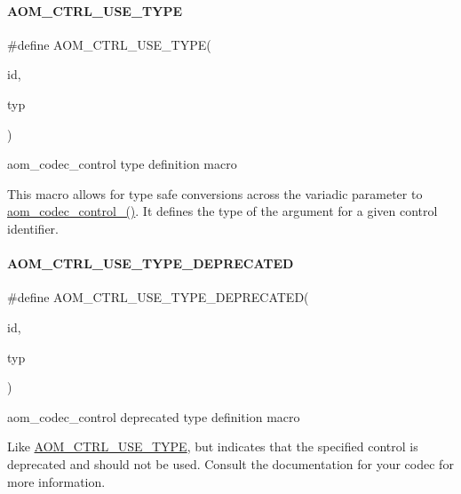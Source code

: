 \paragraph{\texorpdfstring{A\+O\+M\+\_\+\+C\+T\+R\+L\+\_\+\+U\+S\+E\+\_\+\+T\+Y\+PE}{AOM\_CTRL\_USE\_TYPE}}
{\footnotesize\ttfamily \#define A\+O\+M\+\_\+\+C\+T\+R\+L\+\_\+\+U\+S\+E\+\_\+\+T\+Y\+PE(\begin{DoxyParamCaption}\item[{}]{id,  }\item[{}]{typ }\end{DoxyParamCaption})}



aom\+\_\+codec\+\_\+control type definition macro 

This macro allows for type safe conversions across the variadic parameter to \hyperlink{group__codec_ga51eb332a40dcacc39000ab8e0be36b79}{aom\+\_\+codec\+\_\+control\+\_\+()}. It defines the type of the argument for a given control identifier. \mbox{\label{group__codec_ga9cf4b5ac7ea31c5c1b71816aec572acf}} 
\paragraph{\texorpdfstring{A\+O\+M\+\_\+\+C\+T\+R\+L\+\_\+\+U\+S\+E\+\_\+\+T\+Y\+P\+E\+\_\+\+D\+E\+P\+R\+E\+C\+A\+T\+ED}{AOM\_CTRL\_USE\_TYPE\_DEPRECATED}}
{\footnotesize\ttfamily \#define A\+O\+M\+\_\+\+C\+T\+R\+L\+\_\+\+U\+S\+E\+\_\+\+T\+Y\+P\+E\+\_\+\+D\+E\+P\+R\+E\+C\+A\+T\+ED(\begin{DoxyParamCaption}\item[{}]{id,  }\item[{}]{typ }\end{DoxyParamCaption})}



aom\+\_\+codec\+\_\+control deprecated type definition macro 

Like \hyperlink{group__codec_ga09132e6ec2eb0affabe3391181d15f95}{A\+O\+M\+\_\+\+C\+T\+R\+L\+\_\+\+U\+S\+E\+\_\+\+T\+Y\+PE}, but indicates that the specified control is deprecated and should not be used. Consult the documentation for your codec for more information. \mbox{\label{group__codec_ga777f7eab335b851d90e40715efa5396c}} 
